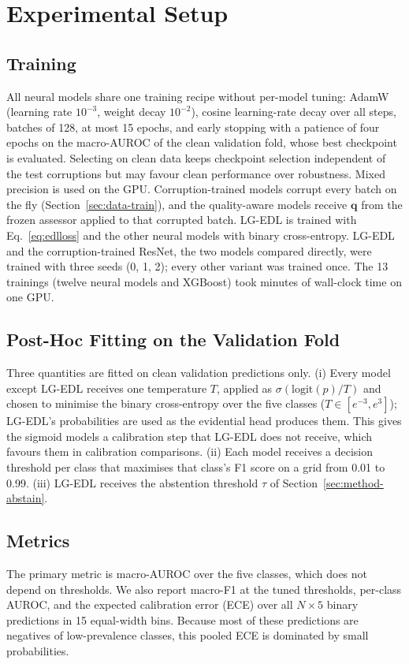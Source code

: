 \section{Experimental Setup}
\label{sec:setup}

\subsection{Training}
\label{sec:setup-train}
All neural models share one training recipe without per-model tuning: AdamW (learning rate $10^{-3}$, weight decay
$10^{-2}$), cosine learning-rate decay over all steps, batches of 128, at most 15 epochs, and early stopping with a
patience of four epochs on the macro-AUROC of the clean validation fold, whose best checkpoint is evaluated.
Selecting on clean data keeps checkpoint selection independent of the test corruptions but may favour clean
performance over robustness. Mixed precision is used on the GPU. Corruption-trained models corrupt every batch on the
fly (Section~\ref{sec:data-train}), and the quality-aware models receive $\mathbf{q}$ from the frozen assessor
applied to that corrupted batch. LG-EDL is trained with Eq.~\eqref{eq:edlloss} and the other neural models with
binary cross-entropy. LG-EDL and the corruption-trained ResNet, the two models compared directly, were trained with
three seeds (0, 1, 2); every other variant was trained once. The 13 trainings (twelve neural models and XGBoost) took
\gpuMinutes{} minutes of wall-clock time on one GPU.

\subsection{Post-Hoc Fitting on the Validation Fold}
\label{sec:setup-fit}
Three quantities are fitted on clean validation predictions only. (i) Every model except LG-EDL receives one
temperature $T$, applied as $\sigma(\mathrm{logit}(p)/T)$ and chosen to minimise the binary cross-entropy over the
five classes ($T\in[e^{-3},e^{3}]$); LG-EDL's probabilities are used as the evidential head produces them. This gives
the sigmoid models a calibration step that LG-EDL does not receive, which favours them in calibration comparisons.
(ii) Each model receives a decision threshold per class that maximises that class's F1 score on a grid from 0.01 to
0.99. (iii) LG-EDL receives the abstention threshold $\tau$ of Section~\ref{sec:method-abstain}.

\subsection{Metrics}
\label{sec:setup-metrics}
The primary metric is macro-AUROC over the five classes, which does not depend on thresholds. We also report macro-F1
at the tuned thresholds, per-class AUROC, and the expected calibration error (ECE) over all $N\times5$ binary
predictions in 15 equal-width bins. Because most of these predictions are negatives of low-prevalence classes, this
pooled ECE is dominated by small probabilities.

